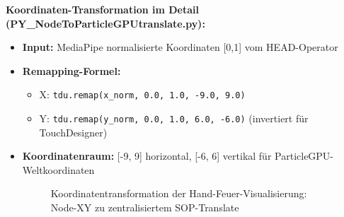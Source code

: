 \textbf{Koordinaten-Transformation im Detail (PY\_NodeToParticleGPUtranslate.py):}
\begin{itemize}
    \item \textbf{Input:} MediaPipe normalisierte Koordinaten [0,1] vom HEAD-Operator
    \item \textbf{Remapping-Formel:} 
    \begin{itemize}
        \item X: \texttt{tdu.remap(x\_norm, 0.0, 1.0, -9.0, 9.0)}
        \item Y: \texttt{tdu.remap(y\_norm, 0.0, 1.0, 6.0, -6.0)} (invertiert für TouchDesigner)
    \end{itemize}
    \item \textbf{Koordinatenraum:} [-9, 9] horizontal, [-6, 6] vertikal für ParticleGPU-Weltkoordinaten

\begin{figure}[htbp]
    \centering
    \caption{Koordinatentransformation der Hand-Feuer-Visualisierung: Node-XY zu zentralisiertem SOP-Translate}
    \label{fig:coordinate_transformation}
\end{figure}


\end{itemize}
